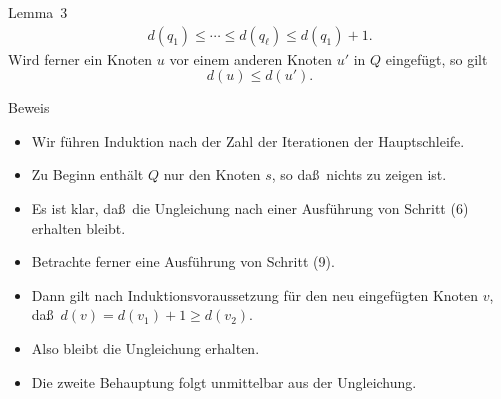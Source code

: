 \documentclass[aspectratio=1610, 11pt]{beamer}
\begin{document}
\begin{frame}
\begin{overprint}
\begin{block}{Lemma~3}
\begin{align*}
				d(q_1)\leq\cdots\leq d(q_\ell)\leq d(q_1)+1.
			\end{align*}
			Wird ferner ein Knoten $u$ vor einem anderen Knoten $u'$ in $Q$ eingef\"ugt, so gilt $$d(u)\leq d(u').$$
		\end{block}
		\begin{exampleblock}{Beweis}
			\begin{itemize}
				\item Wir f\"uhren Induktion nach der Zahl der Iterationen der Hauptschleife.
				\item Zu Beginn enth\"alt $Q$ nur den Knoten $s$, so da\ss\ nichts zu zeigen ist.
				\item Es ist klar, da\ss\ die Ungleichung nach einer Ausf\"uhrung von Schritt (6) erhalten bleibt.
				\item Betrachte ferner eine Ausf\"uhrung von Schritt (9).
				\item Dann gilt nach Induktionsvoraussetzung f\"ur den neu eingef\"ugten Knoten $v$, da\ss\ $d(v)=d(v_1)+1\geq d(v_2)$.
				\item Also bleibt die Ungleichung erhalten.
				\item Die zweite Behauptung folgt unmittelbar aus der Ungleichung.
			\end{itemize}
		\end{exampleblock}
	\end{overprint}
\end{frame}
\end{document}
